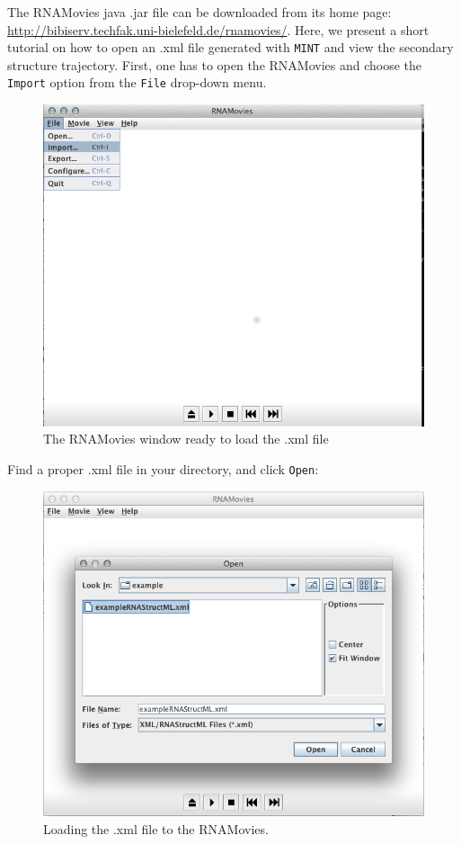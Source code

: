 \documentclass[12pt]{article}
\begin{document}
The RNAMovies \cite{Evers1999}  java .jar file can be downloaded from its home page: \url{http://bibiserv.techfak.uni-bielefeld.de/rnamovies/}. Here, we present a short tutorial on how to open an .xml file generated with {\tt MINT} and view the secondary structure trajectory. First, one has to open the RNAMovies and choose the {\tt Import} option from the {\tt File} drop-down menu. 
\begin{figure}[h!]
\centering
\includegraphics[scale=0.4]{./pictures/RNAmovies_1.png}
\caption{The RNAMovies window ready to load the .xml file}
\end{figure}
\newpage
Find a proper .xml file in your directory, and click {\tt Open}:
\begin{figure}[h!]
\centering
\includegraphics[scale=0.4]{./pictures/RNAmovies_2.png}
\caption{Loading the .xml file to the RNAMovies.}
\end{figure}
\end{document}
